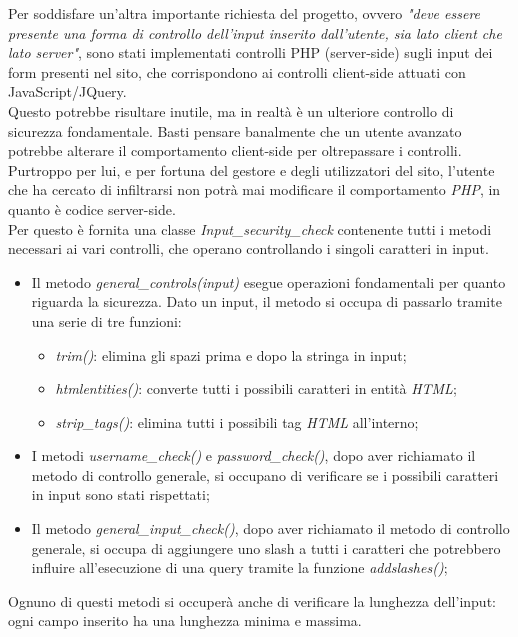 Per soddisfare un'altra importante richiesta del progetto, ovvero \emph{"deve essere presente una forma di controllo dell’input inserito dall’utente, 
sia lato client che lato server"}, sono stati implementati controlli PHP (server-side) sugli input dei form presenti nel sito, che corrispondono ai 
controlli client-side attuati con JavaScript/JQuery.\\
Questo potrebbe risultare inutile, ma in realtà è un ulteriore controllo di sicurezza fondamentale. Basti pensare banalmente che un utente
avanzato potrebbe alterare il comportamento client-side per oltrepassare i controlli. Purtroppo per lui, e per fortuna del gestore e degli
utilizzatori del sito, l'utente che ha cercato di infiltrarsi non potrà mai modificare il comportamento \emph{PHP}, in quanto è codice server-side.\\
Per questo è fornita una classe \emph{Input\_security\_check} contenente tutti i metodi necessari ai vari controlli, che operano controllando 
i singoli caratteri in input.
\begin{itemize}
    \item Il metodo \emph{general\_controls(input)} esegue operazioni fondamentali per quanto riguarda la sicurezza. Dato un input, il metodo si 
    occupa di passarlo tramite una serie di tre funzioni: 
    \begin{itemize}
        \item \emph{trim()}: elimina gli spazi prima e dopo la stringa in input;
        \item \emph{htmlentities()}: converte tutti i possibili caratteri in entità \emph{HTML};
        \item \emph{strip\_tags()}: elimina tutti i possibili tag \emph{HTML} all'interno;
    \end{itemize}
    \item I metodi \emph{username\_check()} e \emph{password\_check()}, dopo aver richiamato il metodo di controllo generale, si occupano di 
    verificare se i possibili caratteri in input sono stati rispettati;
    \item Il metodo \emph{general\_input\_check()}, dopo aver richiamato il metodo di controllo generale, si occupa di aggiungere uno slash a 
    tutti i caratteri che potrebbero influire all'esecuzione di una query tramite la funzione \emph{addslashes()};
\end{itemize}

Ognuno di questi metodi si occuperà anche di verificare la lunghezza dell'input: ogni campo inserito ha una lunghezza minima e massima.\\